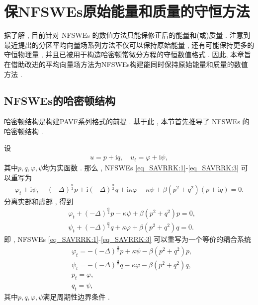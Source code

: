 \chapter[保NFSWEs原始能量和质量的守恒方法]{保NFSWEs原始能量和质量的守恒方法}
据了解 , 目前针对 NFSWEs 的数值方法只能保修正后的能量和(或)质量 . 
注意到最近提出的分区平均向量场系列方法不仅可以保持原始能量 , 还有可能保持更多的守恒物理量 , 并且已被用于构造哈密顿常微分方程的守恒数值格式\cite{caiPartitionedAveragedVector2018} . 
因此, 本章旨在借助改进的平均向量场方法为NFSWEs构建能同时保持原始能量和质量的数值方法 . 
\section{NFSWEs的哈密顿结构}\label{Section_PAVF: 2_1}

哈密顿结构是构建PAVF系列格式的前提 . %
基于此 , 本节首先推导了 NFSWEs 的哈密顿结构 . 

设
\begin{align}
u = p+\mathrm{i}q , \quad u_t = \varphi+ \mathrm{i}\psi , 
\end{align}
其中$p , q , \varphi , \psi$均为实函数 . 那么 , NFSWEs \eqref{eq_SAVRRK:1}-\eqref{eq_SAVRRK:3} 可以重写为
\begin{align}\label{eq_PAVF:28}
\varphi_{t}+\mathrm{i}\psi_{t}+\left( -\Delta \right) ^{\frac{\alpha }{2}}p+\mathrm{i}\left( -\Delta \right) ^{\frac{\alpha }{2}}q+\mathrm{i}\kappa \varphi-\kappa \psi+\beta \left( p^{2}+q^{2}\right) \left( p+\mathrm{i} q\right) =0 . 
\end{align}
分离实部和虚部 , 得到
\begin{align}
&\varphi_{t}+\left( -\Delta \right) ^{\frac{\alpha }{2}}p-\kappa \psi+\beta \left( p^{2}+q^{2}\right)p=0 , \nonumber\\
&\psi_{t}+\left( -\Delta \right) ^{\frac{\alpha }{2}}q+\kappa \varphi+\beta \left( p^{2}+q^{2}\right)q=0 . \label{eq_PAVF:29}
\end{align}
即 , NFSWEs \eqref{eq_SAVRRK:1}-\eqref{eq_SAVRRK:3} 可以重写为一个等价的耦合系统
\begin{align}
&\varphi_{t}=-\left( -\Delta \right) ^{\frac{\alpha }{2}}p+\kappa \psi-\beta \left( p^{2}+q^{2}\right)p\label{eq_PAVF:30} , \\
&\psi_{t}=-\left( -\Delta \right) ^{\frac{\alpha }{2}}q-\kappa \varphi-\beta \left( p^{2}+q^{2}\right)q\label{eq_PAVF:31} , \\
&p_t=\varphi , \label{eq_PAVF:32}\\
&q_t=\psi , \label{eq_PAVF:33}
\end{align}
其中$p , q , \varphi , \psi$满足周期性边界条件 . 

